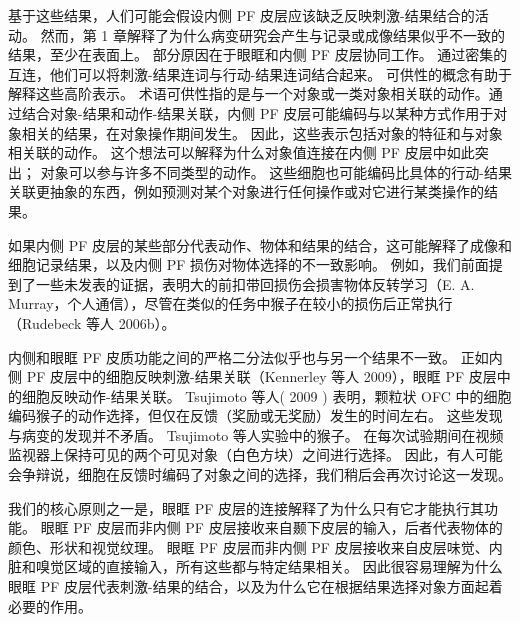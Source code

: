 基于这些结果，人们可能会假设内侧 PF 皮层应该缺乏反映刺激-结果结合的活动。 然而，第 1 章解释了为什么病变研究会产生与记录或成像结果似乎不一致的结果，至少在表面上。 部分原因在于眼眶和内侧 PF 皮层协同工作。 通过密集的互连，他们可以将刺激-结果连词与行动-结果连词结合起来。
可供性的概念有助于解释这些高阶表示。 术语可供性指的是与一个对象或一类对象相关联的动作。通过结合对象-结果和动作-结果关联，内侧 PF 皮层可能编码与以某种方式作用于对象相关的结果，在对象操作期间发生。 因此，这些表示包括对象的特征和与对象相关联的动作。 这个想法可以解释为什么对象值连接在内侧 PF 皮层中如此突出； 对象可以参与许多不同类型的动作。 这些细胞也可能编码比具体的行动-结果关联更抽象的东西，例如预测对某个对象进行任何操作或对它进行某类操作的结果。\par
如果内侧 PF 皮层的某些部分代表动作、物体和结果的结合，这可能解释了成像和细胞记录结果，以及内侧 PF 损伤对物体选择的不一致影响。 例如，我们前面提到了一些未发表的证据，表明大的前扣带回损伤会损害物体反转学习（E. A. Murray，个人通信），尽管在类似的任务中猴子在较小的损伤后正常执行（Rudebeck 等人 2006b）。\par
内侧和眼眶 PF 皮质功能之间的严格二分法似乎也与另一个结果不一致。 正如内侧 PF 皮层中的细胞反映刺激-结果关联（Kennerley 等人 2009），眼眶 PF 皮层中的细胞反映动作-结果关联。 Tsujimoto 等人( 2009 ) 表明，颗粒状 OFC 中的细胞编码猴子的动作选择，但仅在反馈（奖励或无奖励）发生的时间左右。 这些发现与病变的发现并不矛盾。 Tsujimoto 等人实验中的猴子。 在每次试验期间在视频监视器上保持可见的两个可见对象（白色方块）之间进行选择。 因此，有人可能会争辩说，细胞在反馈时编码了对象之间的选择，我们稍后会再次讨论这一发现。\par
我们的核心原则之一是，眼眶 PF 皮层的连接解释了为什么只有它才能执行其功能。 眼眶 PF 皮层而非内侧 PF 皮层接收来自颞下皮层的输入，后者代表物体的颜色、形状和视觉纹理。 眼眶 PF 皮层而非内侧 PF 皮层接收来自皮层味觉、内脏和嗅觉区域的直接输入，所有这些都与特定结果相关。 因此很容易理解为什么眼眶 PF 皮层代表刺激-结果的结合，以及为什么它在根据结果选择对象方面起着必要的作用。\par

